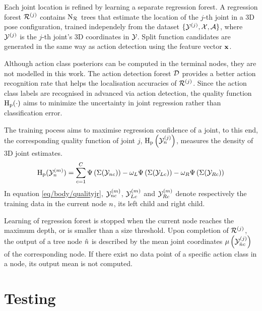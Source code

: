 Each joint location is refined by learning a separate regression forest.  
A regression forest $\mathcal{R}^{(j)}$ contains $\mathrm{N_{\mathcal{R}}}$ trees that estimate the location of the $j$-th joint in a 3D pose configuration, trained independely from the dataset $\{ \mathcal{Y}^{(j)}, \mathcal{X}, \mathcal{A}\}$, where $\mathcal{Y}^{(j)}$ is the $j$-th joint's 3D coordinates in $\mathcal{Y}$. 
Split function candidates are generated in the same way as action detection using the feature vector $\mathbf{x}$. 

Although action class posteriors can be computed in the terminal nodes, they are not modelled in this work. The action detection forest $\mathcal{D}$ provides a better action recognition rate that helps the localisation accuracies of $\mathcal{R}^{(j)}$. Since the action class labels are recognised in advanced via action detection, the quality function $\mathrm{H_{p}}(\cdot)$ aims to minimize the uncertainty in joint regression rather than classification error.

The training pocess aims to maximise regression confidence of a joint, to this end, the corresponding quality function of joint $j$, $\mathrm{H_{p}}\left(\mathcal{Y}^{(j)}_{n}\right)$, measures the density of 3D joint estimates.
\begin{equation}
	\label{eq/body/qualityjr}
	\mathrm{H_{p}}(\mathcal{Y}^{(m)}_{n}) = \displaystyle\sum_{c = 1}^{C} \Psi\left(\Sigma(\mathcal{Y}_{n c})\right) - \omega_{L}\Psi\left(\Sigma(\mathcal{Y}_{Lc})\right) - \omega_{R}\Psi\left(\Sigma(\mathcal{Y}_{Rc})\right)
\end{equation}
In equation \ref{eq/body/qualityjr}, $\mathcal{Y}^{(m)}_{n c}$, $\mathcal{Y}^{(m)}_{L c}$ and $\mathcal{Y}^{(m)}_{R c}$ denote respectively the training data in the current node $n$, its left child and right child.  

Learning of regression forest is stopped when the current node reaches the maximum depth, or is smaller than a size threshold.  
Upon completion of $\mathcal{R}^{(j)}$, the output of a tree node ${\hat{n}}$ is described by the mean joint coordinates $\mu\left(\mathcal{Y}^{(j)}_{{\hat{n}} c}\right)$ of the corresponding node. If there exist no data point of a specific action class in a node, its output mean is not computed.  

\section{Testing}

